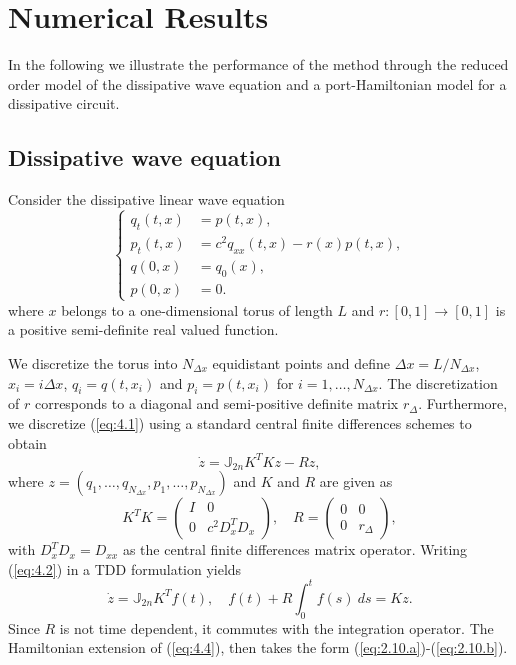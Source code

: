 \section{Numerical Results} \label{sec:4}
In the following we illustrate the performance of the method through the reduced order model of the dissipative wave equation and a port-Hamiltonian model for a dissipative circuit.

\subsection{Dissipative wave equation} \label{sec:4.1}

Consider the dissipative linear wave equation
\begin{equation} \label{eq:4.1}
	\left\{
	\begin{aligned}
		q_{t}(t,x) &= p(t,x), \\
		p_{t}(t,x) &= c^2 q_{xx}(t,x) - r(x)  p(t,x) , \\
		q(0,x) &= q_0(x), \\
		p(0,x) &= 0.
	\end{aligned}
	\right.
\end{equation}
where $x$ belongs to a one-dimensional torus of length $L$ and $r:[0,1]\to[0,1]$ is a positive semi-definite real valued function. 

We discretize the torus into $N_{\Delta x}$ equidistant points and define $\Delta x = L/N_{\Delta x}$, $x_i = i\Delta x$, $q_i=q(t,x_i)$ and $p_i=p(t,x_i)$ for $i = 1, \dots, N_{\Delta x}$. The discretization of $r$ corresponds to a diagonal and semi-positive definite matrix $r_\Delta$. Furthermore, we discretize (\ref{eq:4.1}) using a standard central finite differences schemes to obtain
\begin{equation} \label{eq:4.2}
	\dot z = \mathbb J_{2n} K^T K z - R z,
\end{equation}
where $z = (q_1,\dots,q_{N_{\Delta x}},p_1,\dots,p_{N_{\Delta x}})$ and $K$ and $R$ are given as
\begin{equation} \label{eq:4.3}
	K^T K =
	\begin{pmatrix}
		I & 0 \\
		0 & c^2D_x^TD_x
	\end{pmatrix} , \quad
	R =
	\begin{pmatrix}
		0 & 0 \\
		0 & r_\Delta
	\end{pmatrix},
\end{equation}
with $D_x^TD_x = D_{xx}$ as the central finite differences matrix operator. Writing (\ref{eq:4.2}) in a TDD formulation yields
\begin{equation} \label{eq:4.4}
	\dot z = \mathbb J_{2n} K^T f(t), \quad f(t) + R \int_0^t f(s) \ ds = K z.
\end{equation}
Since $R$ is not time dependent, it commutes with the integration operator. The Hamiltonian extension of (\ref{eq:4.4}), then takes the form (\ref{eq:2.10.a})-(\ref{eq:2.10.b}).

